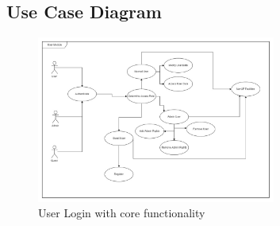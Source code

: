 \subsection{Use Case Diagram}

\begin{figure}[H]
		\centering
		\includegraphics[width=0.7\textwidth]{user/img/UserUseCase.jpg}
		\caption{User Login with core functionality }
\end{figure}



